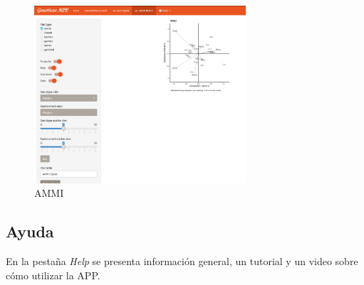\begin{figure}[H]
	\begin{center}
		\includegraphics[width=0.70\textwidth]{./Graficos/AMMI_GE.png}
	\end{center}
	\caption{AMMI}
	\label{fig:fig4313}
\end{figure}


\subsection{Ayuda}

En la pestaña \emph{Help} se presenta información general, un tutorial y un video sobre  cómo utilizar la APP.
